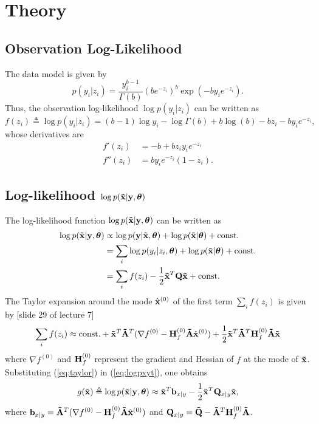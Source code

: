 \documentclass[a4paper,10pt]{article}
\def\bH{{\bf H}}
\def\bQ{{\bf Q}}
\def\btQ{{\bf \tilde Q}}
\def\btA{{\bf \tilde A}}
\def\bx{{\bf x}}
\def\bb{{\bf b}}
\def\by{{\bf y}}
\def\btx{{\bf{\tilde x}}}
\def\btheta{{\boldsymbol \theta}}
\begin{document}
\section{Theory}
\subsection{Observation Log-Likelihood}
The data model is given by
\begin{equation*}
 p(y_i|z_i) = \frac{y_i^{b-1}}{\Gamma(b)} (be^{-z_i})^b \exp (-by_ie^{-z_i}).
\end{equation*}
Thus, the observation log-likelihood $\log p(y_i|z_i)$ can be written as
\begin{equation*}
 f(z_i) \triangleq \log p(y_i|z_i) = (b-1) \log y_i - \log \Gamma(b) + b \log (b) - b z_i - b y_i e^{-z_i},
\end{equation*}
whose derivatives are
\begin{align*}
 f'(z_i) &= -b + b z_i y_i e^{-z_i} \\
 f''(z_i) &= b y_i e^{-z_i} (1 - z_i) .
\end{align*}

\subsection{Log-likelihood $\log p(\btx|\by, \btheta)$}
The log-likelihood function $\log p(\btx|\by, \btheta)$ can be written as
\begin{align}
 \log p(\btx|\by, \btheta) &\propto \log p(\by| \btx, \btheta) + \log p(\btx|\btheta) + \mathrm{const.} \nonumber \\
 &= \sum_i \log p(y_i|z_i, \btheta) + \log p(\btx|\btheta) + \mathrm{const.} \nonumber \\
 &= \sum_i f(z_i) - \frac{1}{2} \btx^T \bQ \btx  + \mathrm{const.}
 \label{eq:logpxyt}
\end{align}
The Taylor expansion around the mode $\hat \bx^{(0)}$ of the first term $\sum_i f(z_i)$ is given by [slide 29 of lecture 7]
\begin{equation}
 \sum_i f(z_i) \approx \mathrm{const.} + \btx^T \btA^T (\nabla f^{(0)} - \bH_f^{(0)} \btA \hat \bx^{(0)}) + \frac{1}{2} \btx^T \btA^T \bH_f^{(0)} \btA \btx
 \label{eq:taylor}
\end{equation}
where $\nabla f^{(0)}$ and $\bH_f^{(0)}$ represent the gradient and Hessian of $f$ at the mode of $\btx$.
Substituting (\ref{eq:taylor}) in (\ref{eq:logpxyt}), one obtains
\begin{equation}
 g(\btx) \triangleq \log p(\btx|\by, \btheta) \approx \btx^T \bb_{x|y} - \frac{1}{2} \btx^T \bQ_{x|y} \btx,
 \label{eq:gx}
\end{equation}
where $\bb_{x|y} = \btA^T (\nabla f^{(0)} - \bH_f^{(0)} \btA \hat \bx^{(0)})$ and $\bQ_{x|y} = \btQ - \btA^T \bH_f^{(0)} \btA$.
\end{document}
